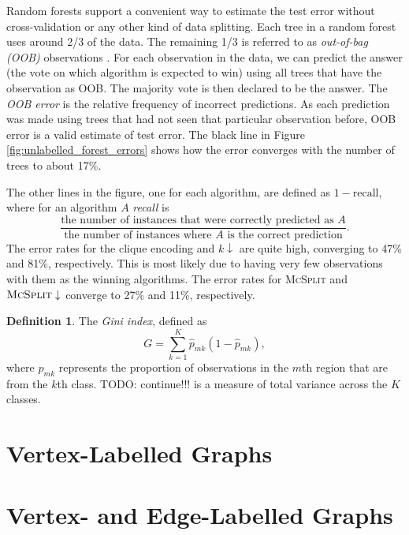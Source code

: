 \documentclass{l4proj}
\theoremstyle{definition}
\newtheorem{definition}{Definition}[section]
\theoremstyle{remark}
\begin{document}
Random forests support a convenient way to estimate the test error without
cross-validation or any other kind of data splitting. Each tree in a random
forest uses around 2/3 of the data. The remaining 1/3 is referred to as
\emph{out-of-bag (OOB)} observations \cite{James:2014:ISL:2517747}. For each
observation in the data, we can predict the answer (the vote on which algorithm
is expected to win) using all trees that have the observation as OOB. The
majority vote is then declared to be the answer. The \emph{OOB error} is
the relative frequency of incorrect predictions. As each prediction was made
using trees that had not seen that particular observation before, OOB error is a
valid estimate of test error. The black line in Figure
\ref{fig:unlabelled_forest_errors} shows how the error converges with the number
of trees to about 17\%.

The other lines in the figure, one for each algorithm, are defined as $1 -
\text{recall}$, where for an algorithm $A$ \emph{recall}
\cite{citeulike:12882259} is
\[ \frac{\text{the number of instances that were correctly predicted as
      $A$}}{\text{the number of instances where $A$ is the correct
      prediction}}. \]
The error rates for the clique encoding and $k\downarrow$ are quite high,
converging to 47\% and 81\%, respectively. This is most likely due to having very
few observations with them as the winning algorithms. The error rates for
\textsc{McSplit} and $\textsc{McSplit}\downarrow$ converge to 27\% and 11\%,
respectively.

\begin{definition}
  The \emph{Gini index}, defined as \cite{James:2014:ISL:2517747}
  \[ G = \sum_{k=1}^K \hat{p}_{mk}(1-\hat{p}_{mk}), \]
  where $\hat{p}_{mk}$ represents the proportion of observations in the $m$th
  region that are from the $k$th class. TODO: continue!!!
  is a measure of total variance across the $K$ classes.
\end{definition}

\section{Vertex-Labelled Graphs}

\section{Vertex- and Edge-Labelled Graphs}




\end{document}
